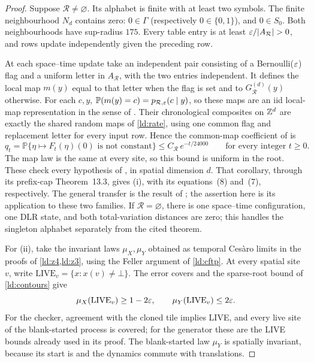 \begin{proof}
Suppose $\mathcal R\ne\varnothing$. Its alphabet is finite with at least two symbols. The finite neighbourhood $N_d$ contains zero: $0\in\Gamma$ (respectively $0\in\{0,1\}$), and $0\in S_0$. Both neighbourhoods have sup-radius $175$. Every table entry is at least $\eps/|A_{\mathcal R}|>0$, and rows update independently given the preceding row.

At each space--time update take an independent pair consisting of a Bernoulli($\varepsilon$) flag and a uniform letter in $A_{\mathcal R}$, with the two entries independent. It defines the local map $m(y)$ equal to that letter when the flag is set and to $G_{\mathcal R}^{(d)}(y)$ otherwise. For each $c,y$, $\mathbb{P}(m(y)=c)=p_{\mathcal R,\varepsilon}(c\mid y)$, so these maps are an iid local-map representation in the sense of \cite[Section~2.2]{DM26}. Their chronological composites on $\mathbb{Z}^d$ are exactly the shared random maps of \cref{ld:rate}, using one common flag and replacement letter for every input row. Hence the common-map coefficient of \cite[equation~(4)]{DM26} is
\[
  q_t=\mathbb{P}\{\eta\mapsto F_t(\eta)(0)\text{ is not constant}\}\le C_{\mathcal R}\,e^{-t/24000}
  \qquad\text{for every integer }t\ge0.
\]
The map law is the same at every site, so this bound is uniform in the root. These check every hypothesis of \cite[Corollary~13.7]{DM26}, in spatial dimension $d$. That corollary, through its prefix-cap Theorem~13.3, gives (i), with its equations~(8) and~(7), respectively. The general transfer is the result of \cite{DM26}; the assertion here is its application to these two families. If $\mathcal R=\varnothing$, there is one space--time configuration, one DLR state, and both total-variation distances are zero; this handles the singleton alphabet separately from the cited theorem.

For (ii), take the invariant laws $\mu_X,\mu_Y$ obtained as temporal Ces\`aro limits in the proofs of \cref{ld:z4,ld:z3}, using the Feller argument of \cref{ld:cftp}. At every spatial site $v$, write $\mathrm{LIVE}_v=\{x:x(v)\ne\bot\}$. The error covers and the sparse-root bound of \cref{ld:contours} give
\[
 \mu_X(\mathrm{LIVE}_v)\ge1-2\varepsilon,\qquad
 \mu_Y(\mathrm{LIVE}_v)\le2\varepsilon.
\]
For the checker, agreement with the cloned tile implies LIVE, and every live site of the blank-started process is covered; for the generator these are the LIVE bounds already used in its proof. The blank-started law $\mu_Y$ is spatially invariant, because its start is and the dynamics commute with translations.


\end{proof}
